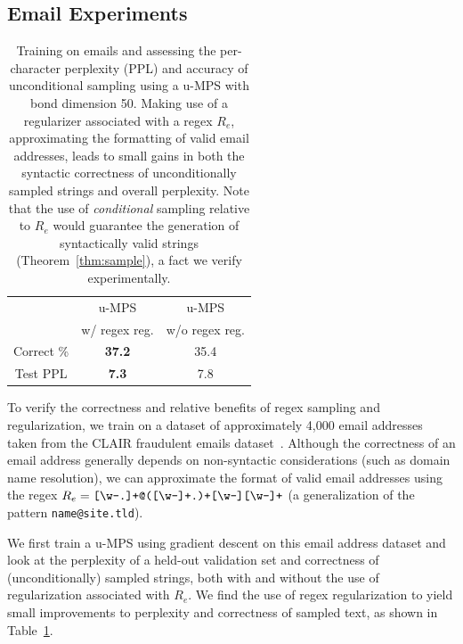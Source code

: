 \subsection{Email Experiments}
%
\begin{table}[t]
\caption{Training on emails and assessing the per-character perplexity (PPL) and accuracy of unconditional sampling using a u-MPS with bond dimension 50. Making use of a regularizer associated with a regex $R_e$, approximating the formatting of valid email addresses, leads to small gains in both the syntactic correctness of unconditionally sampled strings and overall perplexity. Note that the use of \emph{conditional} sampling relative to $R_e$ would guarantee the generation of syntactically valid strings (Theorem~\ref{thm:sample}), a fact we verify experimentally.}
\label{tab:regularization}
\renewcommand{\arraystretch}{1.1}
\begin{center}
\begin{small}
\begin{sc}
\begin{tabular}{c|cc}
           & u-MPS          & u-MPS   \\
           & w/ regex reg.  & w/o regex reg. \\
\hline
Correct \% & \textbf{37.2}  & 35.4    \\
Test PPL   & \textbf{7.3}   & 7.8     \\
\end{tabular}
\end{sc}
\end{small}
\end{center}
\vskip -0.1in
\end{table}

To verify the correctness and relative benefits of regex sampling and regularization, we train on a dataset of approximately 4,000 email addresses taken from the CLAIR fraudulent emails dataset~\citep{radev2008}. Although the correctness of an email address generally depends on non-syntactic considerations (such as domain name resolution), we can approximate the format of valid email addresses using the regex $ R_{e} = \verb![\w-.]+@([\w-]+.)+[\w-][\w-]+! $ (a generalization of the pattern \texttt{name@site.tld}).

We first train a u-MPS using gradient descent on this email address dataset and look at the perplexity of a held-out validation set and correctness of (unconditionally) sampled strings, both with and without the use of regularization associated with $R_e$. We find the use of regex regularization to yield small improvements to perplexity and correctness of sampled text, as shown in Table~\ref{tab:regularization}. 

